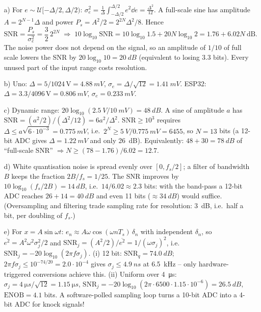 \begin{solution}
a) For $e\sim\mathcal{U}[-\Delta/2,\Delta/2)$:
$\sigma_e^2=\frac1\Delta\int_{-\Delta/2}^{\Delta/2}e^2\dd e=\frac{\Delta^2}{12}$.
A full-scale sine has amplitude $A=2^{N-1}\Delta$ and power
$P_s=A^2/2=2^{2N}\Delta^2/8$. Hence
\[
\mathrm{SNR}=\frac{P_s}{\sigma_e^2}=\frac{3}{2}\,2^{2N}
\;\Rightarrow\;
10\log_{10}\mathrm{SNR}=10\log_{10}1.5+20N\log_{10}2=1.76+6.02N\ \text{dB}.
\]
The noise power does not depend on the signal, so an amplitude of $1/10$ of
full scale lowers the SNR by $20\log_{10}10=\SI{20}{dB}$ (equivalent to losing
$3.3$ bits). Every unused part of the input range costs resolution.

b) Uno: $\Delta=5/1024\,\text{V}=\SI{4.88}{mV}$,
$\sigma_e=\Delta/\sqrt{12}=\SI{1.41}{mV}$.
ESP32: $\Delta=3.3/4096\,\text{V}=\SI{0.806}{mV}$, $\sigma_e=\SI{0.233}{mV}$.

c) Dynamic range: $20\log_{10}(\SI{2.5}{V}/\SI{10}{mV})=\SI{48}{dB}$.
A sine of amplitude $a$ has $\mathrm{SNR}=(a^2/2)/(\Delta^2/12)=6a^2/\Delta^2$.
$\mathrm{SNR}\ge 10^3$ requires $\Delta\le a\sqrt{6\cdot10^{-3}}=\SI{0.775}{mV}$,
i.e.\ $2^N\ge \SI{5}{V}/\SI{0.775}{mV}=6455$, so $N=13$ bits (a 12-bit ADC
gives $\Delta=\SI{1.22}{mV}$ and only \SI{26}{dB}). Equivalently:
$48+30=\SI{78}{dB}$ of ``full-scale SNR'' $\Rightarrow N\ge(78-1.76)/6.02=12.7$.

d) White quantisation noise is spread evenly over $[0,f_s/2]$; a filter of
bandwidth $B$ keeps the fraction $2B/f_s=1/25$. The SNR improves by
$10\log_{10}(f_s/2B)=\SI{14}{dB}$, i.e.\ $14/6.02\approx2.3$ bits: with the
band-pass a 12-bit ADC reaches $26+14=\SI{40}{dB}$ and even 11 bits
($\approx\SI{34}{dB}$) would suffice. (Oversampling and filtering trade
sampling rate for resolution: \SI{3}{dB}, i.e.\ half a bit, per doubling of
$f_s$.)

e) For $x=A\sin\omega t$: $e_n\approx A\omega\cos(\omega nT_s)\,\delta_n$ with
independent $\delta_n$, so $\overline{e^2}=A^2\omega^2\sigma_j^2/2$ and
$\mathrm{SNR}_j=(A^2/2)/\overline{e^2}=1/(\omega\sigma_j)^2$, i.e.\
$\mathrm{SNR}_j=-20\log_{10}(2\pi f\sigma_j)$.
(i) 12 bit: $\mathrm{SNR}_q=\SI{74.0}{dB}$; $2\pi f\sigma_j\le10^{-74/20}=2.0\cdot10^{-4}$
gives $\sigma_j\le\SI{4.9}{ns}$ at \SI{6.5}{kHz} -- only hardware-triggered
conversions achieve this.
(ii) Uniform over \SI{4}{\micro s}: $\sigma_j=\SI{4}{\micro s}/\sqrt{12}=\SI{1.15}{\micro s}$,
$\mathrm{SNR}_j=-20\log_{10}(2\pi\cdot6500\cdot1.15\cdot10^{-6})=\SI{26.5}{dB}$,
$\mathrm{ENOB}=4.1$ bits. A software-polled sampling loop turns a 10-bit ADC
into a 4-bit ADC for knock signals!
\end{solution}

